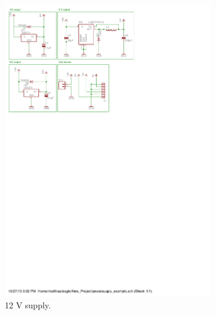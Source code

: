 \begin{figure}[H]
\begin{subfigure}{0.3\linewidth}
\centering
\includegraphics[scale=0.8,trim={0 18.5cm 15.7cm 6.0cm},clip]{img/powersupply.pdf}
\caption{12 V supply.}
\label{fig::sch_power_12V}
\end{subfigure}
\begin{subfigure}{0.4\linewidth}
\centering

\end{subfigure}
\end{figure}
